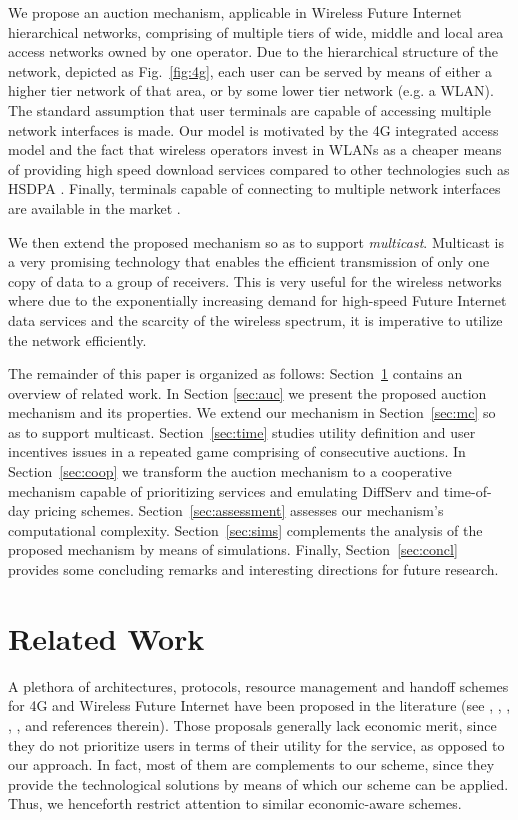 \documentclass[a4paper]{article}
\begin{document}
We propose an auction mechanism, applicable in Wireless Future Internet 
hierarchical networks, comprising of multiple tiers of wide, middle and 
local area access networks owned by one operator. 
Due to the hierarchical structure of the network, depicted as
Fig.~\ref{fig:4g}, each user can be served by means of either a higher 
tier network of that area, or by some lower tier network (e.g. a WLAN). 
The standard assumption that user terminals
are capable of accessing multiple network interfaces is made. Our model
is motivated by the 4G integrated access model and the
fact that wireless operators invest in WLANs as a cheaper means
of providing high speed download services compared to other technologies 
such as HSDPA \cite{epress}.
Finally, terminals capable of connecting to multiple network 
interfaces are available in the market \cite{nokia}.  

We then extend the proposed mechanism so as to
support {\em multicast}. Multicast is a very promising technology that
enables the efficient transmission of only one copy of
data to a group of receivers. This is very useful
for the wireless networks where due to the exponentially increasing
demand for high-speed Future Internet data services and the scarcity 
of the wireless spectrum, it is imperative to utilize the network efficiently.

The remainder of this paper is organized as follows: Section~\ref{sec:rwork} 
contains an overview of related work. In Section \ref{sec:auc}
we present the proposed auction mechanism and its properties. We  
extend our mechanism in Section~\ref{sec:mc} so as to support 
multicast. Section~\ref{sec:time} studies utility definition 
and user incentives issues
in a repeated game comprising of consecutive auctions. In Section~\ref{sec:coop} we 
transform the auction mechanism to a cooperative  
mechanism capable of prioritizing services and emulating 
DiffServ and time-of-day pricing schemes. Section~\ref{sec:assessment}
assesses our mechanism's computational complexity. 
Section~\ref{sec:sims} complements the analysis of the proposed
mechanism by means of simulations.
Finally, Section~\ref{sec:concl} provides some concluding remarks and interesting 
directions for future research.

\section{Related Work}\label{sec:rwork}

A plethora of architectures, protocols, resource management and handoff schemes 
for 4G and Wireless Future Internet have been proposed in the 
literature (see \cite{thesis}, \cite{merakos}, \cite{arch}, \cite{sas}, \cite{dm}, 
\cite{handoff} and references therein). Those proposals generally lack 
economic merit, since they do not prioritize users in terms of 
their utility for the service, as opposed to our approach. In 
fact, most of them are complements to our scheme, since they provide 
the technological solutions by means of which our scheme can be 
applied. Thus, we henceforth restrict attention to similar economic-aware schemes. 
\end{document}
